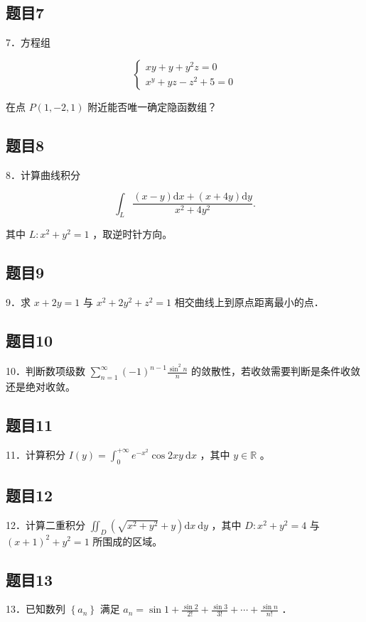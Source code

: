 \documentclass{article}
\begin{document}
\subsection{题目7}
7．方程组

\[
\left\{\begin{array}{l}
x y+y+y^{2} z=0 \\
x^{y}+y z-z^{2}+5=0
\end{array}\right.
\]

在点 \(P(1,-2,1)\) 附近能否唯一确定隐函数组？

\subsection{题目8}
8．计算曲线积分

\[
\int_{L} \frac{(x-y) \mathrm{d} x+(x+4 y) \mathrm{d} y}{x^{2}+4 y^{2}} .
\]

其中 \(L: x^{2}+y^{2}=1\) ，取逆时针方向。

\subsection{题目9}
9．求 \(x+2 y=1\) 与 \(x^{2}+2 y^{2}+z^{2}=1\) 相交曲线上到原点距离最小的点．

\subsection{题目10}
10．判断数项级数 \(\sum_{n=1}^{\infty}(-1)^{n-1} \frac{\sin ^{2} n}{n}\) 的敛散性，若收敛需要判断是条件收敛还是绝对收敛。

\subsection{题目11}
11．计算积分 \(I(y)=\int_{0}^{+\infty} e^{-x^{2}} \cos 2 x y \mathrm{~d} x\) ，其中 \(y \in \mathbb{R}\) 。

\subsection{题目12}
12．计算二重积分 \(\iint_{D}\left(\sqrt{x^{2}+y^{2}}+y\right) \mathrm{d} x \mathrm{~d} y\) ，其中 \(D: x^{2}+y^{2}=4\) 与 \((x+1)^{2}+y^{2}=1\) 所围成的区域。

\subsection{题目13}
13．已知数列 \(\left\{a_{n}\right\}\) 满足 \(a_{n}=\sin 1+\frac{\sin 2}{2!}+\frac{\sin 3}{3!}+\cdots+\frac{\sin n}{n!}\) ．
\end{document}
